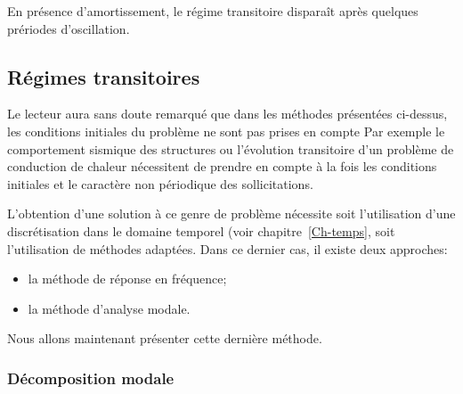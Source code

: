 \medskip
En présence d'amortissement, le régime transitoire disparaît après quelques prériodes d'oscillation.






\medskip{}
\subsection{Régimes transitoires}\label{Sec-RT}

Le lecteur aura sans doute remarqué que dans les méthodes présentées ci-dessus, les conditions initiales du problème ne sont pas prises en compte Par exemple le comportement sismique des structures ou l'évolution transitoire d'un problème de conduction de chaleur nécessitent de prendre en compte à la fois les conditions initiales et le caractère non périodique des sollicitations.

L'obtention d'une solution à ce genre de problème nécessite soit l'utilisation d'une discrétisation dans le domaine temporel (voir chapitre~\ref{Ch-temps}, soit l'utilisation de méthodes adaptées. Dans ce dernier cas, il existe deux approches:
\begin{itemize}
  \item la méthode de réponse en fréquence;
  \item la méthode d'analyse modale.
\end{itemize}
Nous allons maintenant présenter cette dernière méthode.

\medskip
\subsubsection{Décomposition modale}


